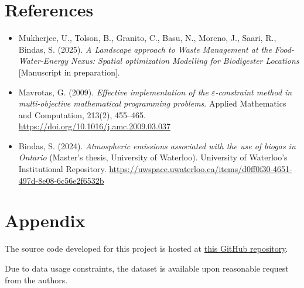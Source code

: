\documentclass[12pt]{article}
\begin{document}
\section*{References}
\begin{itemize}
  \item Mukherjee, U., Tolson, B., Granito, C., Basu, N., Moreno, J., Saari, R., Bindas, S. (2025). \textit{A Landscape approach to Waste Management at the Food-Water-Energy Nexus: Spatial optimization Modelling for Biodigester Locations} [Manuscript in preparation].
  \item Mavrotas, G. (2009). \textit{Effective implementation of the $\varepsilon$-constraint method in multi-objective mathematical programming problems}. Applied Mathematics and Computation, 213(2), 455–465. \url{https://doi.org/10.1016/j.amc.2009.03.037}
  \item Bindas, S. (2024). \textit{Atmospheric emissions associated with the use of biogas in Ontario} (Master’s thesis, University of Waterloo). University of Waterloo's Institutional Repository. \url{https://uwspace.uwaterloo.ca/items/d0ff0f30-4651-497d-8e08-6c56e2f6532b}
\end{itemize}

\section*{Appendix}
The source code developed for this project is hosted at \href{https://github.com/shenghaowang/ece602-introduction-to-optimization-course-project}{this GitHub repository}.

Due to data usage constraints, the dataset is available upon reasonable request from the authors.
\end{document}
